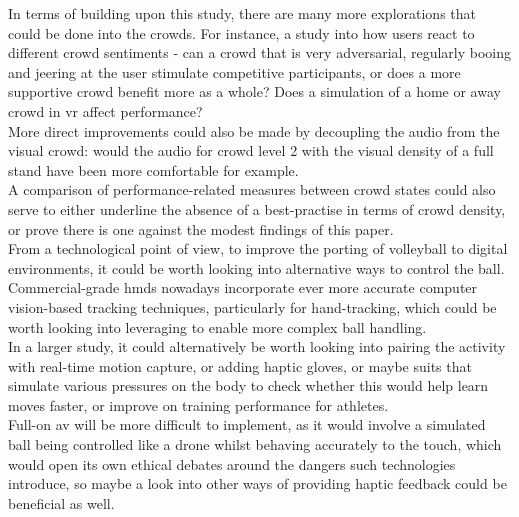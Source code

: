 In terms of building upon this study, there are many more explorations that could be done into the crowds. For instance, a study into how users react to different crowd sentiments - can a crowd that is very adversarial, regularly booing and jeering at the user stimulate competitive participants, or does a more supportive crowd benefit more as a whole? Does a simulation of a home or away crowd in \gls{vr} affect performance?\\
More direct improvements could also be made by decoupling the audio from the visual crowd: would the audio for crowd level 2 with the visual density of a full stand have been more comfortable for example.\\
A comparison of performance-related measures between crowd states could also serve to either underline the absence of a best-practise in terms of crowd density, or prove there is one against the modest findings of this paper.\\

From a technological point of view, to improve the porting of volleyball to digital environments, it could be worth looking into alternative ways to control the ball. Commercial-grade \glspl{hmd} nowadays incorporate ever more accurate computer vision-based tracking techniques, particularly for hand-tracking, which could be worth looking into leveraging to enable more complex ball handling.\\
In a larger study, it could alternatively be worth looking into pairing the activity with real-time motion capture, or adding haptic gloves, or maybe suits that simulate various pressures on the body to check whether this would help learn moves faster, or improve on training performance for athletes.\\
Full-on \acrlong{av} will be more difficult to implement, as it would involve a simulated ball being controlled like a drone whilst behaving accurately to the touch, which would open its own ethical debates around the dangers such technologies introduce, so maybe a look into other ways of providing haptic feedback could be beneficial as well.
